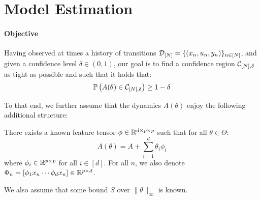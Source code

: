 \documentclass{article}
\begin{document}
\section{Model Estimation}

\label{sec:estimation}

\paragraph{Objective}
Having observed at times a history of transitions $\mathcal{D}_{[N]} = \{(x_n, u_n, y_n)\}_{n\in[N]}$, and given a confidence level $\delta\in(0, 1)$, our goal is to find a confidence region $\mathcal{C}_{[N],\delta}$ as tight as possible and such that it holds that:
\begin{align}
\mathbb{P}\left(A(\theta)\in \mathcal{C}_{[N],\delta}\right) \geq 1-\delta
\label{eq:polytope}
\end{align}



To that end, we further assume that the dynamics $A(\theta)$ enjoy the following additional structure:
\begin{assumption}
\label{assumpt:linear_param}
There exists a known feature tensor $\phi\in \mathbb{R}^{d \times p \times p}$ such that for all $\theta\in\Theta$:
\begin{equation}
    A(\theta) = A + %
    \sum_{i=1}^d \theta_i\phi_i
\end{equation}
where $\phi_i\in\mathbb{R}^{p\times p}$ for all $i\in[d]$. For all $n$, we also denote $\Phi_n = [\phi_1 x_n \cdots \phi_d x_n]\in\mathbb{R}^{p\times d}$.

We also assume that some bound $S$ over $\|\theta\|_\infty$ is known.
\end{assumption}
\end{document}
